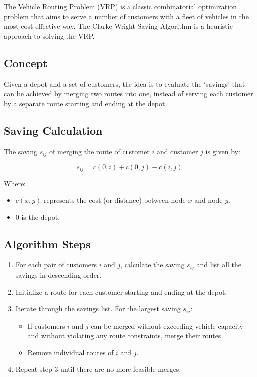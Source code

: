 The Vehicle Routing Problem (VRP) is a classic combinatorial optimization problem that aims to serve a number of customers with a fleet of vehicles in the most cost-effective way. The Clarke-Wright Saving Algorithm is a heuristic approach to solving the VRP. 

\subsection{Concept}

Given a depot and a set of customers, the idea is to evaluate the `savings' that can be achieved by merging two routes into one, instead of serving each customer by a separate route starting and ending at the depot.

\subsection{Saving Calculation}

The saving \(s_{ij}\) of merging the route of customer \(i\) and customer \(j\) is given by:

\begin{equation}
s_{ij} = c(0, i) + c(0, j) - c(i, j)
\end{equation}

Where:
\begin{itemize}
    \item \(c(x, y)\) represents the cost (or distance) between node \(x\) and node \(y\).
    \item \(0\) is the depot.
\end{itemize}

\subsection{Algorithm Steps}

\begin{enumerate}
    \item For each pair of customers \(i\) and \(j\), calculate the saving \(s_{ij}\) and list all the savings in descending order.
    \item Initialize a route for each customer starting and ending at the depot.
    \item Iterate through the savings list. For the largest saving \(s_{ij}\):
    \begin{itemize}
        \item If customers \(i\) and \(j\) can be merged without exceeding vehicle capacity and without violating any route constraints, merge their routes.
        \item Remove individual routes of \(i\) and \(j\).
    \end{itemize}
    \item Repeat step 3 until there are no more feasible merges.
\end{enumerate}

